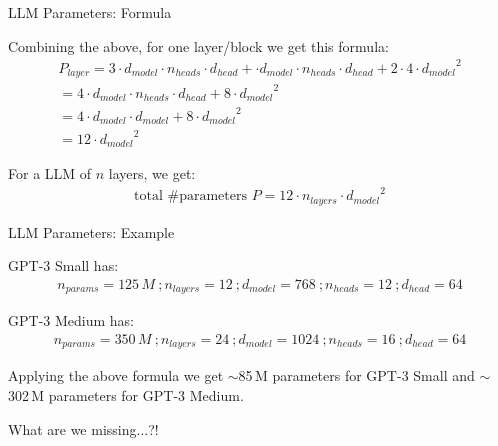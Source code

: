 
\begin{vbframe}{LLM Parameters: Formula}

\vfill

Combining the above, for one layer/block we get this formula:
\begin{equation*}
\begin{array}{c}
P_{layer} = 3 \cdot d_{model} \cdot n_{heads} \cdot d_{head} + \cdot d_{model} \cdot n_{heads} \cdot d_{head} + 2 \cdot 4 \cdot {d_{model}}^2 \\ [8pt]
 = 4 \cdot d_{model} \cdot n_{heads} \cdot d_{head} + 8 \cdot {d_{model}}^2 \\ [8pt]
 = 4 \cdot d_{model} \cdot d_{model} + 8 \cdot {d_{model}}^2 \\ [8pt]
 = 12 \cdot {d_{model}}^2
\end{array}
\end{equation*}

\vskip5mm

For a LLM of $n$ layers, we get:
\begin{equation*}
\begin{array}{c}
\mbox{total \# parameters\ \ } P = 12 \cdot n_{layers} \cdot {d_{model}}^2
\end{array}
\end{equation*}

\vfill

\end{vbframe}


\begin{vbframe}{LLM Parameters: Example}

\vfill

GPT-3 Small has:
\begin{equation*}
\begin{array}{l}
n_{params} = 125\,M ~; n_{layers} = 12 ~; d_{model} = 768 ~; n_{heads} = 12 ~; d_{head} = 64 
\end{array}
\end{equation*}

\vskip2mm

GPT-3 Medium has:
\begin{equation*}
\begin{array}{l}
n_{params} = 350\,M ~; n_{layers} = 24 ~; d_{model} = 1024 ~; n_{heads} = 16 ~; d_{head} = 64 
\end{array}
\end{equation*}

\vskip2mm

Applying the above formula we get $\sim$85\,M parameters for GPT-3 Small and $\sim$302\,M parameters for GPT-3 Medium. 

\vskip2mm

What are we missing...?!

\vfill

\end{vbframe}

